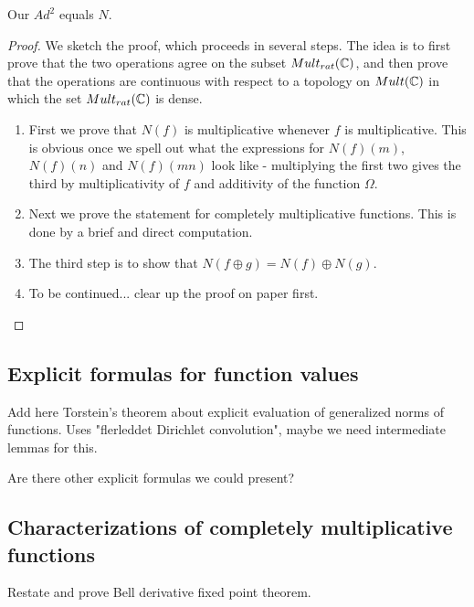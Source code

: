 \begin{theorem}
Our $Ad^2$ equals $N$.
\end{theorem}

\begin{proof}
We sketch the proof, which proceeds in several steps. The idea is to first prove that the two operations agree on the subset $Mult_{rat}(\mathbb{C})$, and then prove that the operations are continuous with respect to a topology on $Mult(\mathbb{C})$ in which the set $Mult_{rat}(\mathbb{C})$ is dense. 


\begin{enumerate}
\item First we prove that $N(f)$ is multiplicative whenever $f$ is multiplicative. This is obvious once we spell out what the expressions for $N(f)(m)$, $N(f)(n)$ and $N(f)(mn)$ look like - multiplying the first two gives the third by multiplicativity of $f$ and additivity of the function $\Omega$.
\item Next we prove the statement for completely multiplicative functions. This is done by a brief and direct computation.
\item The third step is to show that $N(f \oplus g) = N(f) \oplus N(g)$.
\item To be continued... clear up the proof on paper first.


\end{enumerate}

\end{proof}


\subsection{Explicit formulas for function values}

\begin{theorem}
Add here Torstein's theorem about explicit evaluation of generalized norms of functions. Uses "flerleddet Dirichlet convolution", maybe we need intermediate lemmas for this.
\end{theorem}

Are there other explicit formulas we could present?

\subsection{Characterizations of completely multiplicative functions}


\begin{proposition}
Restate and prove Bell derivative fixed point theorem.
\end{proposition}

